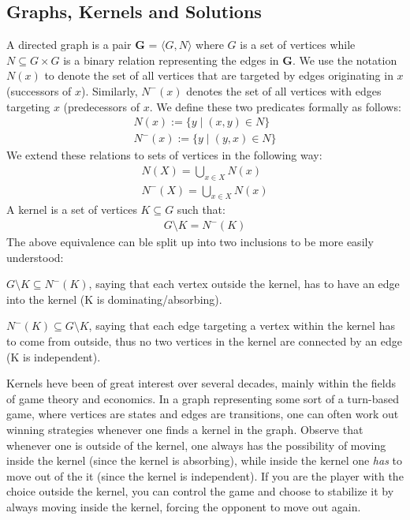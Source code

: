 \subsection{Graphs, Kernels and Solutions}
\label{sub:Graphs, Kernels and Solution}
A directed graph is a pair \textbf{G} = $\langle G,N \rangle$ where $G$ is a set of vertices while $N \subseteq G \times G$ is a binary relation representing the edges in \textbf{G}.
We use the notation $N(x)$ to denote the set of all vertices that are targeted by edges originating in $x$ (successors of $x$).
Similarly, $N^-(x)$ denotes the set of all vertices with edges targeting $x$ (predecessors of $x$.
We define these two predicates formally as follows:
\begin{align}
  N(x) := \{y \;|\; (x,y) \in N\}\\
  N^-(x) := \{ y \;|\; (y,x) \in N \}
\end{align}
We extend these relations to sets of vertices in the following way:
\begin{align}
  N(X) = \bigcup_{x \in X} N(x)\\
  N^-(X) = \bigcup_{x \in X} N(x)
\end{align}
A kernel is a set of vertices $K \subseteq G$ such that:
\begin{align}
  G \setminus K = N^-(K)
\end{align}
The above equivalence can ble split up into two inclusions to be more easily understood:

$G \setminus K \subseteq N^-(K)$, saying that each vertex outside the kernel, has to have an edge into the kernel (K is dominating/absorbing).

$N^-(K) \subseteq G \setminus K$, saying that each edge targeting a vertex within the kernel has to come from outside, thus no two vertices in the kernel are connected by an edge (K is independent).

Kernels heve been of great interest over several decades, mainly within the fields of game theory and economics\cite{neumann}.
In a graph representing some sort of a turn-based game, where vertices are states and edges are transitions, one can often work out winning strategies whenever one finds a kernel in the graph.
Observe that whenever one is outside of the kernel, one always has the possibility of moving inside the kernel (since the kernel is absorbing), while inside the kernel one \textit{has} to move out of the it (since the kernel is independent).
If you are the player with the choice outside the kernel, you can control the game and choose to stabilize it by always moving inside the kernel, forcing the opponent to move out again.

